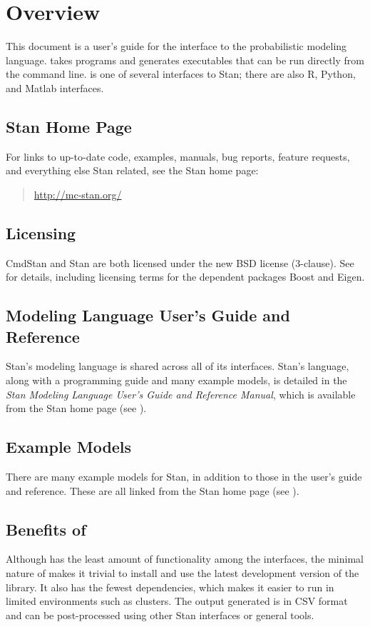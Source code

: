 \chapter{Overview}

\noindent
This document is a user's guide for the \CmdStan interface to the
\Stan probabilistic modeling language. \CmdStan takes \Stan programs
and generates executables that can be run directly from the command
line. \CmdStan is one of several interfaces to Stan; there are also R,
Python, and Matlab interfaces.

\section{Stan Home Page}\label{home-page.section}

For links to up-to-date code, examples, manuals, bug reports, feature
requests, and everything else Stan related, see the Stan home page:
%
\begin{quote}
\url{http://mc-stan.org/}
\end{quote}


\section{Licensing}

CmdStan and Stan are both licensed under the new BSD license
(3-clause). See  for details, including
licensing terms for the dependent packages Boost and Eigen.


\section{Modeling Language User's Guide and Reference}

Stan's modeling language is shared across all of its interfaces.
Stan's language, along with a programming guide and many example
models, is detailed in the {\it Stan Modeling Language User's Guide
  and Reference Manual}, which is available from the Stan home page
(see ).

\section{Example Models}

There are many example models for Stan, in addition to those in the
user's guide and reference. These are all linked from the Stan home
page (see ).


\section{Benefits of \CmdStan}

Although \CmdStan has the least amount of functionality among the
\Stan interfaces, the minimal nature of \CmdStan makes it trivial to
install and use the latest development version of the \Stan
library. It also has the fewest dependencies, which makes it easier to
run in limited environments such as clusters. The output generated is
in CSV format and can be post-processed using other Stan interfaces or
general tools.
